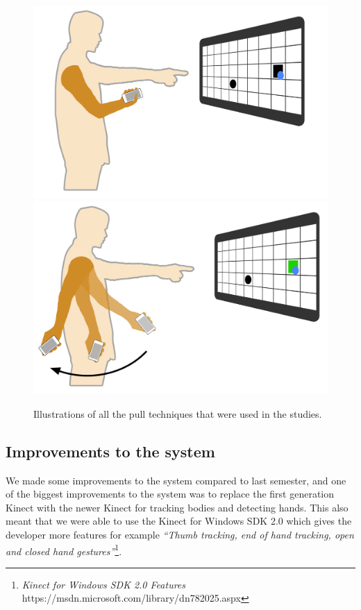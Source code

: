 \begin{figure}[H]
{		\includegraphics[width = 0.16\columnwidth]{images/techniques/throwPull2.jpg}\label{fig:throwPull2}
		\includegraphics[width = 0.16\columnwidth]{images/techniques/throwPull3.jpg}\label{fig:throwPull3}}
	\caption{Illustrations of all the pull techniques that were used in the studies.}
	\label{fig:pullTechniques}
\end{figure}

\subsection*{Improvements to the system}\label{sec:systemImprovements}
We made some improvements to the system compared to last semester, and one of the biggest improvements to the system was to replace the first generation Kinect with the newer Kinect for tracking bodies and detecting hands.
This also meant that we were able to use the Kinect for Windows SDK 2.0 which gives the developer more features for example \textit{``Thumb tracking, end of hand tracking, open and closed hand gestures''}\footnote{\textit{Kinect for Windows SDK 2.0 Features} https://msdn.microsoft.com/library/dn782025.aspx}.

